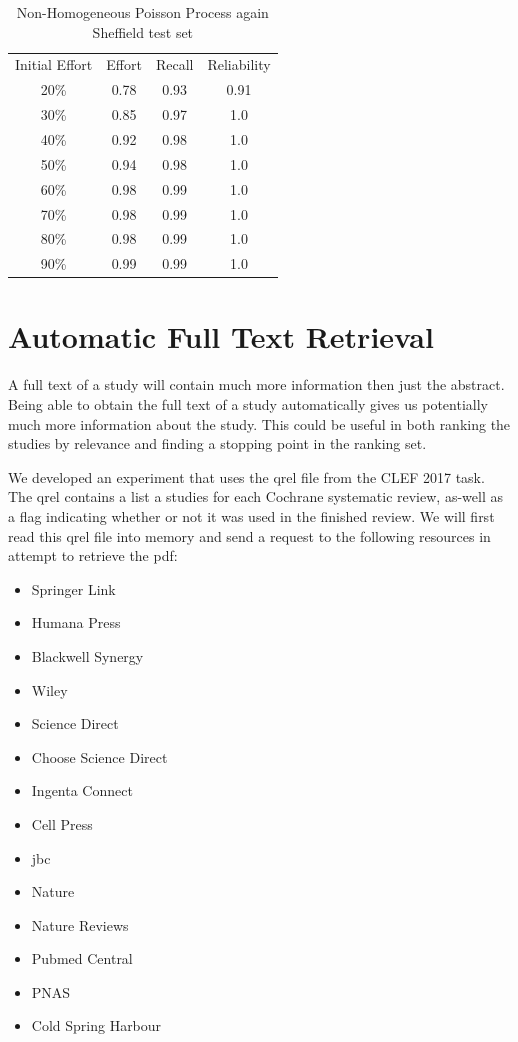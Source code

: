 \begin{table}[H]

\centering
\begin{tabular}{|c|c|c|c|} 
\hline
 Initial Effort & Effort & Recall & Reliability  \\ 
 20\% & 0.78 &		0.93 & 0.91 \\ 
 30\% & 0.85 &		0.97 & 1.0 \\ 
 40\% & 0.92 &		0.98 & 1.0 \\ 
 50\% & 0.94 &		0.98 & 1.0 \\ 
 60\% & 0.98 &		0.99 & 1.0 \\ 
 70\% & 0.98 &		0.99 & 1.0 \\ 
 80\% & 0.98 &		0.99 & 1.0 \\ 
 90\% & 0.99 &		0.99 & 1.0 \\  

  
 \hline
\end{tabular}

\caption{Non-Homogeneous Poisson Process again Sheffield test set}

\end{table}

\section{Automatic Full Text Retrieval} \label{automatic_f_t_r}

A full text of a study will contain much more information then just the abstract. Being able to obtain the full text of a study automatically gives us potentially much more information about the study. This could be useful in both ranking the studies by relevance and finding a stopping point in the ranking set.

We developed an experiment that uses the qrel file from the CLEF 2017 task. The qrel contains a list a studies for each Cochrane systematic review, as-well as a flag indicating whether or not it was used in the finished review. We will first read this qrel file into memory and send a request to the following resources in attempt to retrieve the pdf:

\begin{itemize}
\item Springer Link
\item Humana Press
\item Blackwell Synergy
\item Wiley
\item Science Direct
\item Choose Science Direct
\item Ingenta Connect
\item Cell Press
\item jbc
\item Nature
\item Nature Reviews
\item Pubmed Central
\item PNAS
\item Cold Spring Harbour

\end{itemize}

